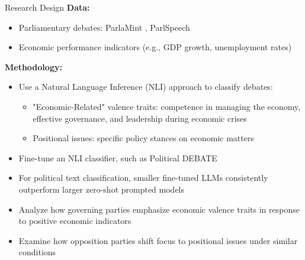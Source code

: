 \documentclass[9pt, aspectratio=169]{beamer}
\newcommand{\customcite}[1]{\textcolor{blue}{\footnotesize\parencite{#1}}}
\begin{document}
\begin{frame}{Research Design}
    \textbf{Data:} \vspace{0.1cm}
    \begin{itemize}
        \item Parliamentary debates: ParlaMint \customcite{erjavec2023parlamint}, ParlSpeech \customcite{rauh2020parlspeech} \vspace{0.1cm}
        \item Economic performance indicators (e.g., GDP growth, unemployment rates)
    \end{itemize}
    \vspace{0.3cm}
    
    \textbf{Methodology:} \vspace{0.1cm}
    \begin{itemize}
        \item Use a Natural Language Inference (NLI) approach to classify debates:\vspace{0.1cm}
        \begin{itemize}
            \item "Economic-Related" valence traits: competence in managing the economy, effective governance, and leadership during economic crises \vspace{0.1cm}
            \item Positional issues: specific policy stances on economic matters \vspace{0.1cm}
        \end{itemize}
        \item Fine-tune an NLI classifier, such as Political DEBATE \customcite{burnham2024political} \vspace{0.1cm}
        \item For political text classification, smaller fine-tuned LLMs consistently outperform larger zero-shot prompted models \customcite{bucher2024finetunedsmallllmsstill} \vspace{0.1cm}
        \item Analyze how governing parties emphasize economic valence traits in response to positive economic indicators \vspace{0.1cm}
        \item Examine how opposition parties shift focus to positional issues under similar conditions
    \end{itemize}
    \vspace{0.3cm}
\end{frame}
\end{document}
